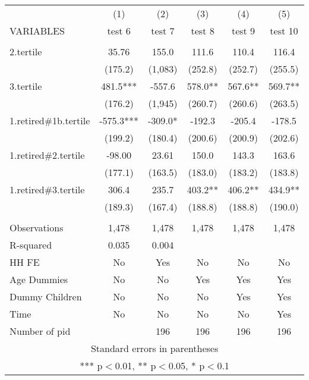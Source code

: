 \begin{tabular}{lccccc} \hline
 & (1) & (2) & (3) & (4) & (5) \\
VARIABLES & test 6 & test 7 & test 8 & test 9 & test 10 \\ \hline
 &  &  &  &  &  \\
2.tertile & 35.76 & 155.0 & 111.6 & 110.4 & 116.4 \\
 & (175.2) & (1,083) & (252.8) & (252.7) & (255.5) \\
3.tertile & 481.5*** & -557.6 & 578.0** & 567.6** & 569.7** \\
 & (176.2) & (1,945) & (260.7) & (260.6) & (263.5) \\
1.retired\#1b.tertile & -575.3*** & -309.0* & -192.3 & -205.4 & -178.5 \\
 & (199.2) & (180.4) & (200.6) & (200.9) & (202.6) \\
1.retired\#2.tertile & -98.00 & 23.61 & 150.0 & 143.3 & 163.6 \\
 & (177.1) & (163.5) & (183.0) & (183.2) & (183.8) \\
1.retired\#3.tertile & 306.4 & 235.7 & 403.2** & 406.2** & 434.9** \\
 & (189.3) & (167.4) & (188.8) & (188.8) & (190.0) \\
 &  &  &  &  &  \\
Observations & 1,478 & 1,478 & 1,478 & 1,478 & 1,478 \\
R-squared & 0.035 & 0.004 &  &  &  \\
HH FE & No & Yes & No & No & No \\
Age Dummies & No & No & Yes & Yes & Yes \\
Dummy Children & No & No & No & Yes & Yes \\
Time & No & No & No & No & Yes \\
 Number of pid &  & 196 & 196 & 196 & 196 \\ \hline
\multicolumn{6}{c}{ Standard errors in parentheses} \\
\multicolumn{6}{c}{ *** p$<$0.01, ** p$<$0.05, * p$<$0.1} \\
\end{tabular}
